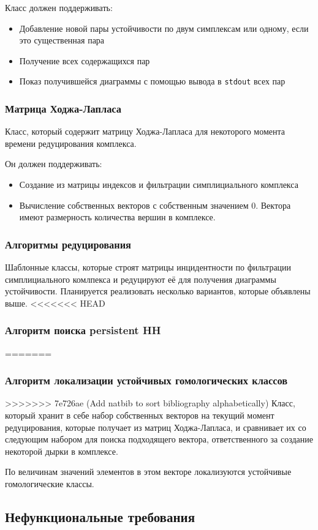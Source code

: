 \documentclass{article}
\begin{document}
Класс должен поддерживать:
\begin{itemize}
  \item Добавление новой пары устойчивости по двум симплексам или одному, если это существенная пара
  \item Получение всех содержащихся пар
  \item Показ получившейся диаграммы с помощью вывода в \verb"stdout" всех пар
\end{itemize}
\subsubsection{Матрица Ходжа-Лапласа}
Класс, который содержит матрицу Ходжа-Лапласа для некоторого момента времени редуцирования комплекса.

Он должен поддерживать:
\begin{itemize}
  \item Создание из матрицы индексов и фильтрации симплициального комплекса
  \item Вычисление собственных векторов с собственным значением 0. Вектора имеют размерность количества вершин в комплексе.
\end{itemize}
\subsubsection{Алгоритмы редуцирования}
Шаблонные классы, которые строят матрицы инцидентности по фильтрации симплициального комлпекса и редуцируют её для получения диаграммы устойчивости. Планируется реализовать несколько вариантов, которые объявлены выше.
<<<<<<< HEAD
\subsubsection{Алгоритм поиска persistent HH}
=======
\subsubsection{Алгоритм локализации устойчивых гомологических классов}
>>>>>>> 7e726ae (Add natbib to sort bibliography alphabetically)
Класс, который хранит в себе набор собственных векторов на текущий момент редуцирования, которые получает из матриц Ходжа-Лапласа, и сравнивает их со следующим набором для поиска подходящего вектора, ответственного за создание некоторой дырки в комплексе.

По величинам значений элементов в этом векторе локализуются устойчивые гомологические классы. \cite{laplacianmatrix}
\subsection{Нефункциональные требования}
\end{document}

